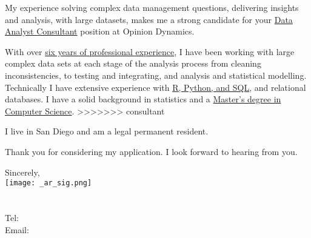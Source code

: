 \documentclass[letterpaper]{article}
\newcommand{\impt}[1]{\uline{#1}}
\newcommand{\CVjobTitle}{Data Analyst Consultant}
\newcommand{\CVcompany}{Opinion Dynamics}
\begin{document}
My experience solving complex data management questions,
delivering insights and analysis,
with large datasets,
makes me a strong candidate for your \impt{\CVjobTitle} position at \CVcompany.

With over \impt{six years of professional experience}, I have been working with
large complex data sets at each stage of the analysis process from cleaning
inconsistencies, to testing and integrating, and analysis and statistical
modelling.
Technically I have extensive experience with \impt{R, Python, and SQL}, and relational databases.
I have a solid background in statistics and a \impt{Master's degree in Computer
Science}.
>>>>>>> consultant

I live in San Diego and am a legal permanent resident.  

Thank you for considering my application.
I look forward to hearing from you.  


Sincerely,\\
    \hspace{1em} 
    \texttt{[image: \_ar\_sig.png]} \\
    \CVname \\
    \small
    \CVaddresswrap \\
    Tel: \CVphone \\
    Email: \CVemail
\end{document}
